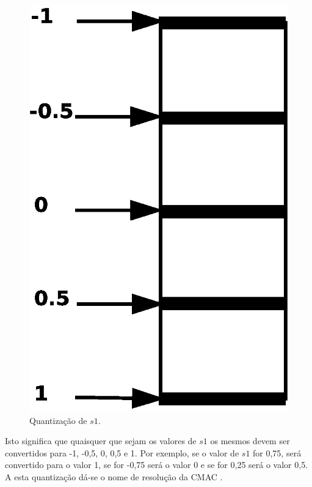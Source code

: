 \begin{figure}[ht]
	\centering
	\includegraphics[width=3 cm]{figuras/input.eps}
	\caption{Quantização de $s1$.}
    	\label{inputs1}
\end{figure}

Isto significa que quaisquer que sejam os valores de $s1$ os mesmos devem ser convertidos para -1, -0,5, 0, 0,5 e 1. 
Por exemplo, se o valor de $s1$ for 0,75, será convertido para o valor 1, se for -0,75 será o valor 0 e se for 0,25 será o valor 0,5. A esta quantização dá-se o nome de resolução da CMAC \cite{Albus1975b}.

